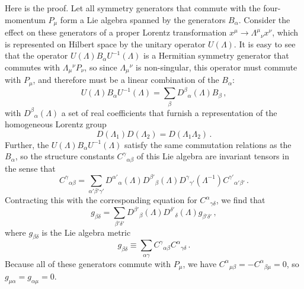 Here is the proof. Let all symmetry generators that commute with the
four-momentum $P_\mu$ form a Lie algebra spanned by the generators $B_\alpha$.
Consider the effect on these generators of a proper Lorentz transformation
$x^\mu\longrightarrow\Lambda^\mu{}_\nu x^\nu$, which is represented on Hilbert
space by the unitary operator $U(\Lambda)$. It is easy to see that the operator
$U(\Lambda)B_\alpha U^{-1}(\Lambda)$ is a Hermitian symmetry generator that
commutes with $\Lambda_\mu{}^\nu P_\nu$, so since $\Lambda_\mu{}^\nu$ is
non-singular, this operator must commute with $P_\mu$, and therefore must be a
linear combination of the $B_\alpha$:
\begin{equation}
  U(\Lambda)B_\alpha U^{-1}(\Lambda)
  =\sum_\beta D^\beta{}_\alpha(\Lambda)B_\beta\,,
  \tag{24.1.1}\label{eq:24.1.1}
\end{equation}
with $D^\beta{}_\alpha(\Lambda)$ a set of real coefficients that furnish a
representation of the homogeneous Lorentz group
\begin{equation}
  D(\Lambda_1)D(\Lambda_2)=D(\Lambda_1\Lambda_2)\,.
  \tag{24.1.2}\label{eq:24.1.2}
\end{equation}
Further, the $U(\Lambda)B_\alpha U^{-1}(\Lambda)$ satisfy the same commutation
relations as the $B_\alpha$, so the structure constants
$C^\gamma{}_{\alpha\beta}$ of this Lie algebra are invariant tensors in the
sense that
\begin{equation}
  C^\gamma{}_{\alpha\beta}
  =\sum_{\alpha'\beta'\gamma'}
  D^{\alpha'}{}_\alpha(\Lambda)
  D^{\beta'}{}_\beta(\Lambda)
  D^\gamma{}_{\gamma'}(\Lambda^{-1})
  C^{\gamma'}{}_{\alpha'\beta'}\,.
  \tag{24.1.3}\label{eq:24.1.3}
\end{equation}
Contracting this with the corresponding equation for
$C^\alpha{}_{\gamma\delta}$, we find that
\begin{equation}
  g_{\beta\delta}
  =\sum_{\beta'\delta'}
  D^{\beta'}{}_\beta(\Lambda)
  D^{\delta'}{}_\delta(\Lambda)
  g_{\beta'\delta'}\,,
  \tag{24.1.4}\label{eq:24.1.4}
\end{equation}
where $g_{\beta\delta}$ is the Lie algebra metric
\begin{equation}
  g_{\beta\delta}
  \equiv\sum_{\alpha\gamma}
  C^\gamma{}_{\alpha\beta}C^\alpha{}_{\gamma\delta}\,.
  \tag{24.1.5}\label{eq:24.1.5}
\end{equation}
Because all of these generators commute with $P_\mu$, we have
$C^\alpha{}_{\mu\beta}=-C^\alpha{}_{\beta\mu}=0$, so
$g_{\mu\alpha}=g_{\alpha\mu}=0$.

